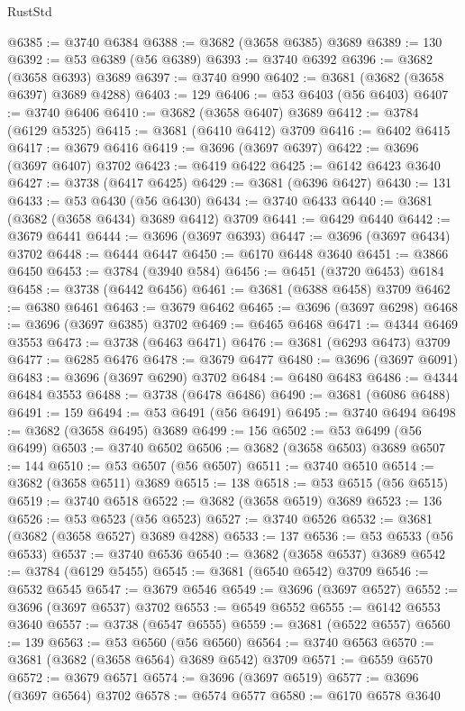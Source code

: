 \begin{lexlean}{RustStd}
\begin{coremodule}
@6385 := @3740 @6384
@6388 := @3682 (@3658 @6385) @3689
@6389 := 130
@6392 := @53 @6389 (@56 @6389)
@6393 := @3740 @6392
@6396 := @3682 (@3658 @6393) @3689
@6397 := @3740 @990
@6402 := @3681 (@3682 (@3658 @6397) @3689 @4288)
@6403 := 129
@6406 := @53 @6403 (@56 @6403)
@6407 := @3740 @6406
@6410 := @3682 (@3658 @6407) @3689
@6412 := @3784 (@6129 @5325)
@6415 := @3681 (@6410 @6412) @3709
@6416 := @6402 @6415
@6417 := @3679 @6416
@6419 := @3696 (@3697 @6397)
@6422 := @3696 (@3697 @6407) @3702
@6423 := @6419 @6422
@6425 := @6142 @6423 @3640
@6427 := @3738 (@6417 @6425)
@6429 := @3681 (@6396 @6427)
@6430 := 131
@6433 := @53 @6430 (@56 @6430)
@6434 := @3740 @6433
@6440 := @3681 (@3682 (@3658 @6434) @3689 @6412) @3709
@6441 := @6429 @6440
@6442 := @3679 @6441
@6444 := @3696 (@3697 @6393)
@6447 := @3696 (@3697 @6434) @3702
@6448 := @6444 @6447
@6450 := @6170 @6448 @3640
@6451 := @3866 @6450
@6453 := @3784 (@3940 @584)
@6456 := @6451 (@3720 @6453) @6184
@6458 := @3738 (@6442 @6456)
@6461 := @3681 (@6388 @6458) @3709
@6462 := @6380 @6461
@6463 := @3679 @6462
@6465 := @3696 (@3697 @6298)
@6468 := @3696 (@3697 @6385) @3702
@6469 := @6465 @6468
@6471 := @4344 @6469 @3553
@6473 := @3738 (@6463 @6471)
@6476 := @3681 (@6293 @6473) @3709
@6477 := @6285 @6476
@6478 := @3679 @6477
@6480 := @3696 (@3697 @6091)
@6483 := @3696 (@3697 @6290) @3702
@6484 := @6480 @6483
@6486 := @4344 @6484 @3553
@6488 := @3738 (@6478 @6486)
@6490 := @3681 (@6086 @6488)
@6491 := 159
@6494 := @53 @6491 (@56 @6491)
@6495 := @3740 @6494
@6498 := @3682 (@3658 @6495) @3689
@6499 := 156
@6502 := @53 @6499 (@56 @6499)
@6503 := @3740 @6502
@6506 := @3682 (@3658 @6503) @3689
@6507 := 144
@6510 := @53 @6507 (@56 @6507)
@6511 := @3740 @6510
@6514 := @3682 (@3658 @6511) @3689
@6515 := 138
@6518 := @53 @6515 (@56 @6515)
@6519 := @3740 @6518
@6522 := @3682 (@3658 @6519) @3689
@6523 := 136
@6526 := @53 @6523 (@56 @6523)
@6527 := @3740 @6526
@6532 := @3681 (@3682 (@3658 @6527) @3689 @4288)
@6533 := 137
@6536 := @53 @6533 (@56 @6533)
@6537 := @3740 @6536
@6540 := @3682 (@3658 @6537) @3689
@6542 := @3784 (@6129 @5455)
@6545 := @3681 (@6540 @6542) @3709
@6546 := @6532 @6545
@6547 := @3679 @6546
@6549 := @3696 (@3697 @6527)
@6552 := @3696 (@3697 @6537) @3702
@6553 := @6549 @6552
@6555 := @6142 @6553 @3640
@6557 := @3738 (@6547 @6555)
@6559 := @3681 (@6522 @6557)
@6560 := 139
@6563 := @53 @6560 (@56 @6560)
@6564 := @3740 @6563
@6570 := @3681 (@3682 (@3658 @6564) @3689 @6542) @3709
@6571 := @6559 @6570
@6572 := @3679 @6571
@6574 := @3696 (@3697 @6519)
@6577 := @3696 (@3697 @6564) @3702
@6578 := @6574 @6577
@6580 := @6170 @6578 @3640

\end{coremodule}
\end{lexlean}
